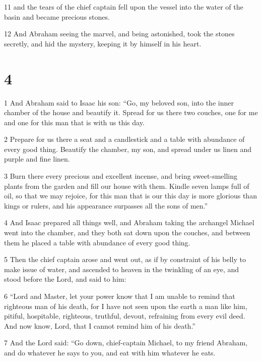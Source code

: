\par 11 and the tears of the chief captain fell upon the vessel into the water of the basin and became precious stones. 

\par 12 And Abraham seeing the marvel, and being astonished, took the stones secretly, and hid the mystery, keeping it by himself in his heart.

\chapter{4}

\par 1 And Abraham said to Isaac his son: “Go, my beloved son, into the inner chamber of the house and beautify it. Spread for us there two couches, one for me and one for this man that is with us this day. 

\par 2 Prepare for us there a seat and a candlestick and a table with abundance of every good thing. Beautify the chamber, my son, and spread under us linen and purple and fine linen. 

\par 3 Burn there every precious and excellent incense, and bring sweet-smelling plants from the garden and fill our house with them. Kindle seven lamps full of oil, so that we may rejoice, for this man that is our this day is more glorious than kings or rulers, and his appearance surpasses all the sons of men.” 

\par 4 And Isaac prepared all things well, and Abraham taking the archangel Michael went into the chamber, and they both sat down upon the couches, and between them he placed a table with abundance of every good thing. 

\par 5 Then the chief captain arose and went out, as if by constraint of his belly to make issue of water, and ascended to heaven in the twinkling of an eye, and stood before the Lord, and said to him: 

\par 6 “Lord and Master, let your power know that I am unable to remind that righteous man of his death, for I have not seen upon the earth a man like him, pitiful, hospitable, righteous, truthful, devout, refraining from every evil deed. And now know, Lord, that I cannot remind him of his death.” 

\par 7 And the Lord said: “Go down, chief-captain Michael, to my friend Abraham, and do whatever he says to you, and eat with him whatever he eats. 

